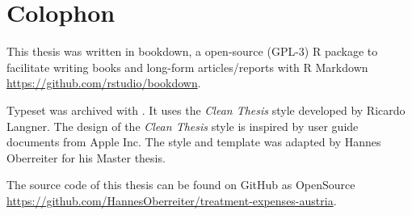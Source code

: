 \pagestyle{empty}
\hfill
\vfill
{}
\section*{Colophon}

This thesis was written in bookdown, a open-source (GPL-3) R package to facilitate writing books and long-form articles/reports with R Markdown \url{https://github.com/rstudio/bookdown}.

Typeset was archived with \LaTeXe. It uses the \textit{Clean Thesis} style developed by Ricardo Langner. The design of the \textit{Clean Thesis} style is inspired by user guide documents from Apple Inc. The style and template was adapted by Hannes Oberreiter for his Master thesis.

The source code of this thesis can be found on GitHub as OpenSource \url{https://github.com/HannesOberreiter/treatment-expenses-austria}.


